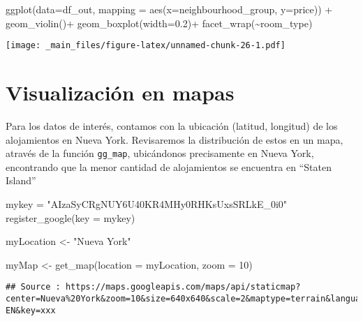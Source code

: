 \documentclass[
]{book}
\newenvironment{Shaded}{\begin{snugshade}}{\end{snugshade}}
\newcommand{\AttributeTok}[1]{\textcolor[rgb]{0.77,0.63,0.00}{#1}}
\newcommand{\DecValTok}[1]{\textcolor[rgb]{0.00,0.00,0.81}{#1}}
\newcommand{\FloatTok}[1]{\textcolor[rgb]{0.00,0.00,0.81}{#1}}
\newcommand{\FunctionTok}[1]{\textcolor[rgb]{0.00,0.00,0.00}{#1}}
\newcommand{\NormalTok}[1]{#1}
\newcommand{\OtherTok}[1]{\textcolor[rgb]{0.56,0.35,0.01}{#1}}
\newcommand{\SpecialCharTok}[1]{\textcolor[rgb]{0.00,0.00,0.00}{#1}}
\newcommand{\StringTok}[1]{\textcolor[rgb]{0.31,0.60,0.02}{#1}}
\begin{document}
\begin{Shaded}
\begin{Highlighting}[]
\FunctionTok{ggplot}\NormalTok{(}\AttributeTok{data=}\NormalTok{df\_out, }\AttributeTok{mapping =} \FunctionTok{aes}\NormalTok{(}\AttributeTok{x=}\NormalTok{neighbourhood\_group, }\AttributeTok{y=}\NormalTok{price)) }\SpecialCharTok{+}
  \FunctionTok{geom\_violin}\NormalTok{()}\SpecialCharTok{+}
  \FunctionTok{geom\_boxplot}\NormalTok{(}\AttributeTok{width=}\FloatTok{0.2}\NormalTok{)}\SpecialCharTok{+}
  \FunctionTok{facet\_wrap}\NormalTok{(}\SpecialCharTok{\textasciitilde{}}\NormalTok{room\_type)}
\end{Highlighting}
\end{Shaded}

\texttt{[image: \_main\_files/figure-latex/unnamed-chunk-26-1.pdf]}

\hypertarget{visualizaciuxf3n-en-mapas}{%
\section*{Visualización en mapas}\label{visualizaciuxf3n-en-mapas}}

Para los datos de interés, contamos con la ubicación (latitud, longitud) de los alojamientos en Nueva York. Revisaremos la distribución de estos en un mapa, através de la función \texttt{gg\_map}, ubicándonos precisamente en Nueva York, encontrando que la menor cantidad de alojamientos se encuentra en ``Staten Island''

\begin{Shaded}
\begin{Highlighting}[]
\NormalTok{mykey }\OtherTok{=} \StringTok{"AIzaSyCRgNUY6U40KR4MHy0RHKsUxsSRLkE\_0i0"}
\FunctionTok{register\_google}\NormalTok{(}\AttributeTok{key =}\NormalTok{ mykey)}

\NormalTok{myLocation }\OtherTok{\textless{}{-}} \StringTok{"Nueva York"}

\NormalTok{myMap }\OtherTok{\textless{}{-}} \FunctionTok{get\_map}\NormalTok{(}\AttributeTok{location =}\NormalTok{ myLocation, }\AttributeTok{zoom =} \DecValTok{10}\NormalTok{)}
\end{Highlighting}
\end{Shaded}

\begin{verbatim}
## Source : https://maps.googleapis.com/maps/api/staticmap?center=Nueva%20York&zoom=10&size=640x640&scale=2&maptype=terrain&language=en-EN&key=xxx
\end{verbatim}
\end{document}
